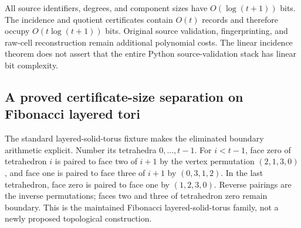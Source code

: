 All source identifiers, degrees, and component sizes have $O(\log(t+1))$
bits.  The incidence and quotient certificates contain $O(t)$ records and
therefore occupy $O(t\log(t+1))$ bits.  Original source validation,
fingerprinting, and raw-cell reconstruction remain additional polynomial
costs.  The linear incidence theorem does not assert that the entire Python
source-validation stack has linear bit complexity.

\subsection{A proved certificate-size separation on Fibonacci layered tori}
\label{subsec:unused-fibonacci}

The standard layered-solid-torus fixture makes the eliminated boundary
arithmetic explicit.  Number its tetrahedra $0,\ldots,t-1$.  For
$i<t-1$, face zero of tetrahedron $i$ is paired to face two of $i+1$ by
the vertex permutation $(2,1,3,0)$, and face one is paired to face three
of $i+1$ by $(0,3,1,2)$.  In the last tetrahedron, face zero is paired to
face one by $(1,2,3,0)$.  Reverse pairings are the inverse permutations;
faces two and three of tetrahedron zero remain boundary.  This is the
maintained Fibonacci layered-solid-torus family, not a newly proposed
topological construction.


